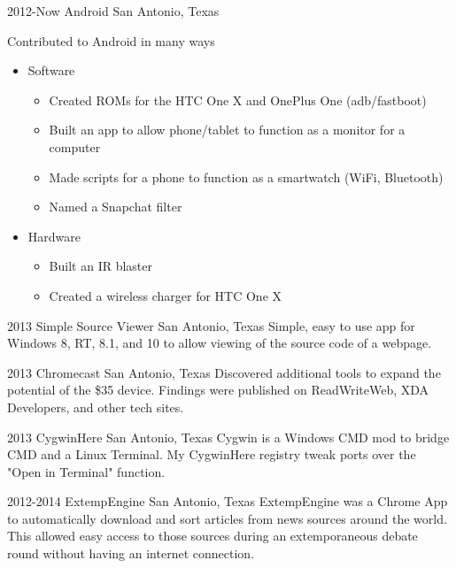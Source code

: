 \documentclass[]{friggeri-cv} %
\begin{document}
\begin{entrylist}


\entry
{2012-Now}
{Android}
{San Antonio, Texas}
{Contributed to Android in many ways 
\begin{itemize}
	\item Software
	\begin{itemize} 
		\item Created ROMs for the HTC One X and OnePlus One (adb/fastboot)  
		\item Built an app to allow phone/tablet to function as a  monitor for a computer
		\item Made scripts for a phone to function as a smartwatch (WiFi, Bluetooth)
		\item Named a Snapchat filter 
	\end{itemize} 
	\item Hardware 
	\begin{itemize}
		\item Built an IR blaster 
		\item Created a wireless charger for HTC One X 
	\end{itemize}
\end{itemize}
}


\entry
{2013}
{Simple Source Viewer}
{San Antonio, Texas}
{Simple, easy to use app for Windows 8, RT, 8.1, and 10 to allow viewing of the source code of a webpage.}


\entry
{2013}
{Chromecast}
{San Antonio, Texas}
{Discovered additional tools to expand the potential of the \$35 device. Findings were published on ReadWriteWeb, XDA Developers, and other tech sites.}


\entry
{2013}
{CygwinHere}
{San Antonio, Texas}
{Cygwin is a Windows CMD mod to bridge CMD and a Linux Terminal. My CygwinHere registry tweak ports over the "Open in Terminal" function.}


\entry
{2012-2014}
{ExtempEngine}
{San Antonio, Texas}
{ExtempEngine was a Chrome App to automatically download and sort articles from news sources around the world. This allowed easy access to those sources during an extemporaneous debate round without having an internet connection.}


\end{entrylist}
\end{document}
